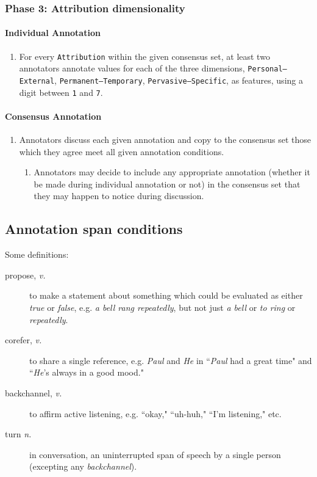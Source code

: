 \documentclass[a4paper,12pt]{article}
\begin{document}
    \subsubsection{Phase 3: Attribution dimensionality}
    \paragraph{Individual Annotation}
    
        \begin{enumerate}
            \item For every \texttt{Attribution} within the given consensus set, at least two annotators annotate values for each of the three dimensions, \texttt{Personal--External}, \texttt{Permanent--Temporary}, \texttt{Pervasive--Specific}, as features, using a digit between \texttt{1} and \texttt{7}.
        \end{enumerate}
    \paragraph{Consensus Annotation}
        \begin{enumerate}
            \item Annotators discuss each given annotation and copy to the consensus set those which they agree meet all given annotation conditions.
                \begin{enumerate}
                    \item Annotators may decide to include any appropriate annotation (whether it be made during individual annotation or not) in the consensus set that they may happen to notice during discussion.
                \end{enumerate}
        \end{enumerate}

    \subsection{Annotation span conditions} \label{conditions}
        Some definitions:
        \begin{description}
            \item[propose, \emph{v.}] to make a statement about something which could be evaluated as either \emph{true} or \emph{false},
                e.g. \emph{a bell rang repeatedly}, but not just \emph{a bell} or \emph{to ring} or \emph{repeatedly}.
            \item[corefer, \emph{v.}] to share a single reference,
                e.g. \emph{Paul} and \emph{He} in ``\emph{Paul} had a great time" and ``\emph{He}'s always in a good mood."
            \item[backchannel, \emph{v.}] to affirm active listening, e.g. ``okay," ``uh-huh," ``I'm listening," etc.
            \item[turn \emph{n.}] in conversation, an uninterrupted span of speech by a single person (excepting any \emph{backchannel}).
        \end{description}
\end{document}
